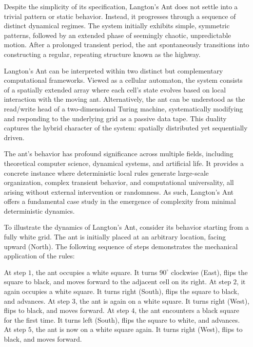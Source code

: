 Despite the simplicity of its specification, Langton's Ant does not settle into a trivial pattern or static behavior. Instead, it progresses through a sequence of distinct dynamical regimes. The system initially exhibits simple, symmetric patterns, followed by an extended phase of seemingly chaotic, unpredictable motion. After a prolonged transient period, the ant spontaneously transitions into constructing a regular, repeating structure known as the highway.

Langton’s Ant can be interpreted within two distinct but complementary computational frameworks. Viewed as a cellular automaton, the system consists of a spatially extended array where each cell's state evolves based on local interaction with the moving ant. Alternatively, the ant can be understood as the read/write head of a two-dimensional Turing machine, systematically modifying and responding to the underlying grid as a passive data tape. This duality captures the hybrid character of the system: spatially distributed yet sequentially driven.

The ant’s behavior has profound significance across multiple fields, including theoretical computer science, dynamical systems, and artificial life. It provides a concrete instance where deterministic local rules generate large-scale organization, complex transient behavior, and computational universality, all arising without external intervention or randomness. As such, Langton’s Ant offers a fundamental case study in the emergence of complexity from minimal deterministic dynamics.


To illustrate the dynamics of Langton's Ant, consider its behavior starting from a fully white grid. The ant is initially placed at an arbitrary location, facing upward (North). The following sequence of steps demonstrates the mechanical application of the rules:

At step $1$, the ant occupies a white square. It turns $90^\circ$ clockwise (East), flips the square to black, and moves forward to the adjacent cell on its right.  
At step $2$, it again occupies a white square. It turns right (South), flips the square to black, and advances.  
At step $3$, the ant is again on a white square. It turns right (West), flips to black, and moves forward.  
At step $4$, the ant encounters a black square for the first time. It turns left (South), flips the square to white, and advances.  
At step $5$, the ant is now on a white square again. It turns right (West), flips to black, and moves forward.


